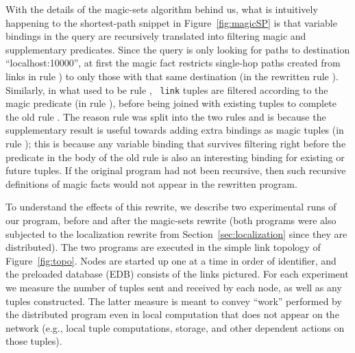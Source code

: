 With the details of the magic-sets algorithm behind us, what is
intuitively happening to the shortest-path snippet in
Figure~\ref{fig:magicSP} is that variable bindings in the query are
recursively translated into filtering magic and supplementary
predicates. Since the query is only looking for paths to
destination ``localhost:10000'', at first the magic fact restricts single-hop
paths created from links in rule
) to only those with that same destination (in the rewritten
rule ). Similarly, in what used to be rule , {\tt
  link} tuples are filtered according to the magic predicate (in rule
), before being joined with existing  tuples to
complete the old rule . The reason rule  was split into
the two rules  and  is because the
supplementary result  is useful towards adding extra bindings as
magic tuples (in rule ); this is because any variable
binding that survives filtering right before the 
predicate in the body of the old rule  is also an interesting
binding for existing or future  tuples. If the original
program had not been recursive, then such recursive definitions of magic
facts would not appear in the rewritten program.

To understand the effects of this rewrite, we describe two experimental
runs of our program, before and after the magic-sets rewrite (both
programs were also subjected to the localization rewrite from
Section~\ref{sec:localization} since they are distributed).  The two
programs are executed in the simple link topology of
Figure~\ref{fig:topo}. Nodes are started up one at a time in order of
identifier, and the preloaded database (EDB) consists of the links pictured. For each experiment we measure the number of
tuples sent and received by each node, as well as any 
tuples constructed. The latter measure is meant to convey ``work''
performed by the distributed program even in local computation that does
not appear on the network (e.g., local tuple computations, storage, and
other dependent actions on those tuples).

